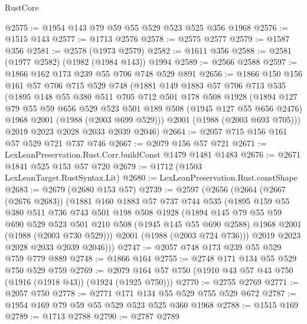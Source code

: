 \begin{lexlean}{RustCore}
\begin{coremodule}
@2575 := @1954 @143 @79 @59 @55 @529 @523 @525 @356 @1968
@2576 := @1515 @143
@2577 := @1713 @2576
@2578 := @2575 @2577
@2579 := @1587 @356
@2581 := @2578 (@1973 @2579)
@2582 := @1611 @356
@2588 := @2581 (@1977 @2582) (@1982 (@1984 @143)) @1994
@2589 := @2566 @2588
@2597 := @1866 @162 @173 @239 @55 @706 @748 @529 @891
@2656 := @1866
    @150
    @156
    @161
    @57
    @706
    @715
    @529
    @748
    (@1881
      @149
      @1883
      @57
      @706
      @713
      @535
      (@1895
        @148
        @55
        @380
        @511
        @705
        @712
        @501
        @178
        @508
        @1928
        (@1894
          @127
          @79
          @55
          @59
          @656
          @529
          @523
          @501
          @189
          @508
          (@1945 @127 @55 @656 @2476)
          @1968
          @2001
          (@1988 (@2003 @699 @529)))
        @2001
        (@1988 (@2003 @693 @705)))
      @2019
      @2023
      @2028
      @2033
      @2039
      @2046)
@2664 := @2057 @715 @156 @161 @57 @529 @721 @737 @746
@2667 := @2079 @156 @57 @721
@2671 := LexLeanPreservation.Rust.Corr.buildConst @1479 @1481 @1483
@2676 := @2671 @1841 @525 @153 @57 @720
@2679 := @1712 (@1503 LexLeanTarget.RustSyntax.Lit)
@2680 := LexLeanPreservation.Rust.constShape
@2683 := @2679 (@2680 @153 @57)
@2739 := @2597
    (@2656
      (@2664
        (@2667 (@2676 @2683))
        (@1881
          @160
          @1883
          @57
          @737
          @744
          @535
          (@1895
            @159
            @55
            @380
            @511
            @736
            @743
            @501
            @198
            @508
            @1928
            (@1894
              @145
              @79
              @55
              @59
              @690
              @529
              @523
              @501
              @210
              @508
              (@1945 @145 @55 @690 @2588)
              @1968
              @2001
              (@1988 (@2003 @730 @529)))
            @2001
            (@1988 (@2003 @724 @736)))
          @2019
          @2023
          @2028
          @2033
          @2039
          @2046)))
@2747 := @2057 @748 @173 @239 @55 @529 @759 @779 @889
@2748 := @1866 @164
@2755 := @2748 @171 @134 @55 @529 @750 @529 @759
@2769 := @2079 @164 @57 @750 (@1910 @43 @57 @43 @750 (@1916 (@1918 @43)) (@1924 (@1925 @750)))
@2770 := @2755 @2769
@2771 := @2057 @750
@2778 := @2771 @171 @134 @55 @529 @755 @529 @672
@2787 := @1954 @169 @79 @59 @55 @529 @523 @525 @360 @1968
@2788 := @1515 @169
@2789 := @1713 @2788
@2790 := @2787 @2789

\end{coremodule}
\end{lexlean}

